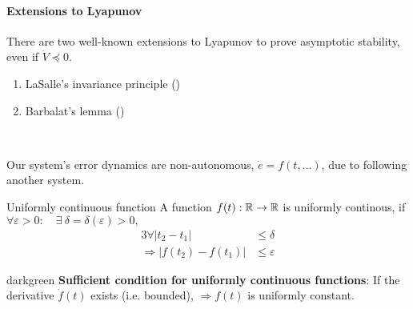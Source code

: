 \paragraph{Extensions to Lyapunov}
There are two well-known extensions to Lyapunov to prove
asymptotic stability, even if $\dot{V} \preceq 0$.
\begin{enumerate}
\item LaSalle's invariance principle
    ()
\item Barbalat's lemma
    ()
\end{enumerate}~

Our system's error dynamics are non-autonomous,
$\dot{e} = f(t, \dots)$, due to
following another system.
\begin{figure}[H]
\centering
{}
\end{figure}

\begin{definition}{Uniformly continuous function}
A function $f(t): \mathbb{R} \rightarrow \mathbb{R}$ 
is uniformly continous, if\\
$\forall \varepsilon>0:
    \quad \exists~ \delta = \delta(\varepsilon) >0,$
\begin{alignat*}{3}
\forall |t_2 - t_1| &\leq \delta\\
\Rightarrow |  f(t_2) - f(t_1) | &\leq \varepsilon
\end{alignat*}
\end{definition}

\begin{conclusion}{darkgreen}
\textbf{Sufficient condition for uniformly continuous functions}:
If the derivative $\dot{f}(t)$ exists (i.e. bounded),
$\Rightarrow f(t)$ is uniformly constant.
\end{conclusion}

